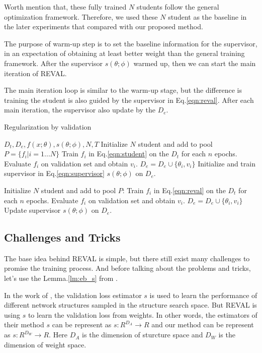 \documentclass[english]{sobraep}
\begin{document}
Worth mention that, these fully trained $N$ students follow the general optimization framework. Therefore, we used these $N$ student as the baseline in the later experiments that compared with our proposed method.  

The purpose of warm-up step is to set the baseline information for the supervisor, in an expectation of obtaining at least better weight than the general training framework. After the supervisor $s(\theta;\phi)$ warmed up, then we can start the main iteration of REVAL.

The main iteration loop is similar to the warm-up stage, but the difference is training the student is also guided by the supervisor in Eq.\ref{eqn:reval}. After each main iteration, the supervisor also update by the $D_e$.

\begin{algorithm}
\caption{Regularization by validation}\label{alg:reval}
\begin{algorithmic}[1]
\Require $D_t, D_e, f(x;\theta), s(\theta;\phi), N, T$
\State Initialize $N$ student and add to pool $P =  \{ f_i|i=1...N \}$
    \State Train $f_i$ in Eq.\ref{eqn:student} on the $D_t$ for each $n$ epochs.
    \State Evaluate $f_i$ on validation set and obtain $v_i$.
    \State $D_e = D_e \cup \{\theta_i, v_i\}$
\EndFor
\State Initialize and train supervisor in Eq.\ref{eqn:supervisor} $s(\theta;\phi)$ on $D_e$.

    \State Initialize $N$ student and add to pool $P$:
        \State Train $f_i$ in Eq.\ref{eqn:reval} on the $D_t$ for each $n$ epochs.
        \State Evaluate $f_i$ on validation set and obtain $v_i$.
        \State $D_e = D_e \cup \{\theta_i, v_i\}$
    \EndFor
    \State Update supervisor $s(\theta;\phi)$ on $D_e$.
\EndFor
\end{algorithmic}
\end{algorithm}

\subsection{Challenges and Tricks}

The base idea behind REVAL is simple, but there still exist many challenges to promise the training process. And before talking about the problems and tricks, let's use the Lemma.\ref{lm:eb_s} from \cite{li2020neural}.

In the work of \texttt{\cite{li2020neural}}, the validation loss estimator $s$ is used to learn the performance of different network structures sampled in the structure search space. But REVAL is using $s$ to learn the validation loss from weights. In other words, the estimators of their method $s$ can be represent as $s: R^{D_{A}} \xrightarrow{} R$ and our method can be represent as $s: R^{D_{W}} \xrightarrow{} R$. Here $D_{A}$ is the dimension of sturcture space and $D_{W}$ is the  dimension of weight space.
\end{document}
